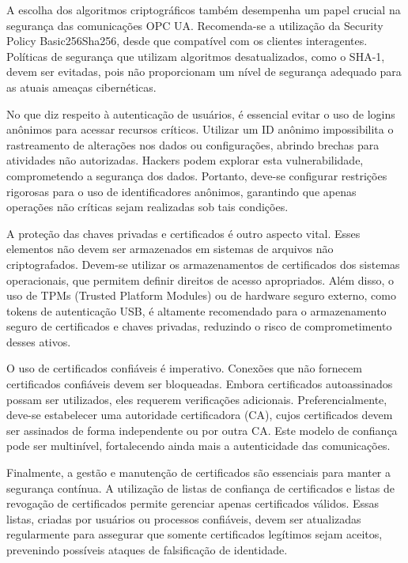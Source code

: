 A escolha dos algoritmos criptográficos também desempenha um papel crucial na segurança das comunicações OPC UA. Recomenda-se a utilização da Security Policy Basic256Sha256, desde que compatível com os clientes interagentes. Políticas de segurança que utilizam algoritmos desatualizados, como o SHA-1, devem ser evitadas, pois não proporcionam um nível de segurança adequado para as atuais ameaças cibernéticas.

No que diz respeito à autenticação de usuários, é essencial evitar o uso de logins anônimos para acessar recursos críticos. Utilizar um ID anônimo impossibilita o rastreamento de alterações nos dados ou configurações, abrindo brechas para atividades não autorizadas. Hackers podem explorar esta vulnerabilidade, comprometendo a segurança dos dados. Portanto, deve-se configurar restrições rigorosas para o uso de identificadores anônimos, garantindo que apenas operações não críticas sejam realizadas sob tais condições.

A proteção das chaves privadas e certificados é outro aspecto vital. Esses elementos não devem ser armazenados em sistemas de arquivos não criptografados. Devem-se utilizar os armazenamentos de certificados dos sistemas operacionais, que permitem definir direitos de acesso apropriados. Além disso, o uso de TPMs (Trusted Platform Modules) ou de hardware seguro externo, como tokens de autenticação USB, é altamente recomendado para o armazenamento seguro de certificados e chaves privadas, reduzindo o risco de comprometimento desses ativos.

O uso de certificados confiáveis é imperativo. Conexões que não fornecem certificados confiáveis devem ser bloqueadas. Embora certificados autoassinados possam ser utilizados, eles requerem verificações adicionais. Preferencialmente, deve-se estabelecer uma autoridade certificadora (CA), cujos certificados devem ser assinados de forma independente ou por outra CA. Este modelo de confiança pode ser multinível, fortalecendo ainda mais a autenticidade das comunicações.

Finalmente, a gestão e manutenção de certificados são essenciais para manter a segurança contínua. A utilização de listas de confiança de certificados e listas de revogação de certificados permite gerenciar apenas certificados válidos. Essas listas, criadas por usuários ou processos confiáveis, devem ser atualizadas regularmente para assegurar que somente certificados legítimos sejam aceitos, prevenindo possíveis ataques de falsificação de identidade.

